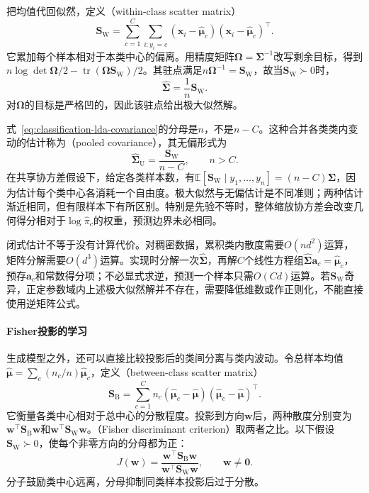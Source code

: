 把均值代回似然，定义（within-class scatter matrix）
\begin{equation}
  \label{eq:classification-lda-within}
  \bm{S}_{\mathrm{W}}
    =\sum_{c=1}^{C}\sum_{i:y_i=c}
      (\bm{x}_i-\hat{\bm{\mu}}_c)
      (\bm{x}_i-\hat{\bm{\mu}}_c)^{\top}.
\end{equation}
它累加每个样本相对于本类中心的偏离。用精度矩阵$\bm{\Omega}=\bm{\Sigma}^{-1}$改写剩余目标，得到$n\log\det\bm{\Omega}/2-\operatorname{tr}(\bm{\Omega}\bm{S}_{\mathrm{W}})/2$。其驻点满足$n\bm{\Omega}^{-1}=\bm{S}_{\mathrm{W}}$，故当$\bm{S}_{\mathrm{W}}\succ0$时，
\begin{equation}
  \label{eq:classification-lda-covariance}
  \hat{\bm{\Sigma}}=\frac1n\bm{S}_{\mathrm{W}} .
\end{equation}
对$\bm{\Omega}$的目标是严格凹的，因此该驻点给出极大似然解。

式~\eqref{eq:classification-lda-covariance}的分母是$n$，不是$n-C$。这种合并各类类内变动的估计称为（pooled covariance），其无偏形式为
\[
  \hat{\bm{\Sigma}}_{\mathrm{U}}
    =\frac{\bm{S}_{\mathrm{W}}}{n-C},\qquad n>C .
\]
在共享协方差假设下，给定各类样本数，有$\mathbb{E}[\bm{S}_{\mathrm{W}}\mid y_1,\ldots,y_n]=(n-C)\bm{\Sigma}$，因为估计每个类中心各消耗一个自由度。极大似然与无偏估计是不同准则；两种估计渐近相同，但有限样本下有所区别。特别是先验不等时，整体缩放协方差会改变几何得分相对于$\log\hat\pi_c$的权重，预测边界未必相同。

闭式估计不等于没有计算代价。对稠密数据，累积类内散度需要$O(nd^2)$运算，矩阵分解需要$O(d^3)$运算。实现时分解一次$\hat{\bm{\Sigma}}$，再解$C$个线性方程组$\hat{\bm{\Sigma}}\bm{a}_c=\hat{\bm{\mu}}_c$，预存$\bm{a}_c$和常数得分项；不必显式求逆，预测一个样本只需$O(Cd)$运算。若$\bm{S}_{\mathrm{W}}$奇异，正定参数域内上述极大似然解并不存在，需要降低维数或作正则化，不能直接使用逆矩阵公式。

\paragraph{Fisher投影的学习}
生成模型之外，还可以直接比较投影后的类间分离与类内波动。令总样本均值$\hat{\bm{\mu}}=\sum_c(n_c/n)\hat{\bm{\mu}}_c$，定义（between-class scatter matrix）
\[
  \bm{S}_{\mathrm{B}}
    =\sum_{c=1}^{C}n_c
      (\hat{\bm{\mu}}_c-\hat{\bm{\mu}})
      (\hat{\bm{\mu}}_c-\hat{\bm{\mu}})^{\top}.
\]
它衡量各类中心相对于总中心的分散程度。投影到方向$\bm{w}$后，两种散度分别变为$\bm{w}^{\top}\bm{S}_{\mathrm{B}}\bm{w}$和$\bm{w}^{\top}\bm{S}_{\mathrm{W}}\bm{w}$。（Fisher discriminant criterion）取两者之比。以下假设$\bm{S}_{\mathrm{W}}\succ0$，使每个非零方向的分母都为正：
\begin{equation}
  \label{eq:classification-fisher-criterion}
  J(\bm{w})
    =\frac{\bm{w}^{\top}\bm{S}_{\mathrm{B}}\bm{w}}
      {\bm{w}^{\top}\bm{S}_{\mathrm{W}}\bm{w}},
    \qquad \bm{w}\ne\bm{0}.
\end{equation}
分子鼓励类中心远离，分母抑制同类样本投影后过于分散。

